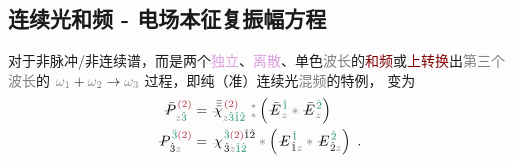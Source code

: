 \subsection{连续光和频 - 电场本征复振幅方程}\label{ssec:SFG_discrete}

对于\textcolor{NavyBlue}{非脉冲}/\textcolor{NavyBlue}{非连续谱}，而是两个\textcolor{Plum}{独立}、\textcolor{Plum}{离散}、\textcolor{NavyBlue}{单色}\textcolor{gray}{波长}的\textcolor{Maroon}{和频}或\textcolor{Maroon}{上转换}出\textcolor{gray}{第三个波长}的 $\mathcolor{gray}{\omega}_{\textcolor{gray}{1}} + \mathcolor{gray}{\omega}_{\textcolor{gray}{2}} \to \mathcolor{gray}{\omega}_{\textcolor{gray}{3}}$ 过程，即纯\textcolor{NavyBlue}{（准）连续光}\textcolor{gray}{混频}的特例， 变为
\begin{subequations} \label{eq:DP^(2)-3_12-discrete}
	\begin{align}
		\Xint{\mathcolor{gray}{-}}{30}{\bar{P}}^{\;\! \textcolor{Maroon}{(2)} }_{\;\! \mathcolor{gray}{z} \textcolor{PineGreen}{\hat{3}}} &= \Xint{{}^{}_{\mathcolor{gray}{-}}}{23}{\bar{\bar{\bar{\chi}}}}^{\;\!  \textcolor{Maroon}{(2)}}_{\mathcolor{gray}{z} \textcolor{PineGreen}{\hat{3} \hat{1} \hat{2}} } ~{}^{\mathcolor{gray}{*}}_{\mathcolor{gray}{*}} \left( \Xint{\mathcolor{gray}{-}}{295}{\bar{E}}^{\;\! \textcolor{PineGreen}{\hat{1}} }_{\;\! \mathcolor{gray}{z} } \mathcolor{gray}{*} \Xint{\mathcolor{gray}{-}}{295}{\bar{E}}^{\;\! \textcolor{PineGreen}{\hat{2}} }_{\;\! \mathcolor{gray}{z} } \right) \label{eq:vec-DP^(2)-3_12-discrete} \\
		\Xint{\mathcolor{gray}{-}}{30}{P}^{\;\! \textcolor{PineGreen}{\hat{3}} \textcolor{Maroon}{(2)} }_{\;\! \hat{3}\mathcolor{gray}{z}} &= \Xint{{}^{}_{\mathcolor{gray}{-}}}{23}{\chi}^{\;\! \textcolor{PineGreen}{\hat{3}} \textcolor{Maroon}{(2)} \hat{1} \hat{2} }_{\;\! \hat{3} \mathcolor{gray}{z} \textcolor{PineGreen}{\hat{1} \hat{2}}} \mathcolor{gray}{*} \left( \Xint{\mathcolor{gray}{-}}{295}{E}^{\;\!\textcolor{PineGreen}{\hat{1}}}_{\;\! \hat{1} \mathcolor{gray}{z}} \mathcolor{gray}{*} \Xint{\mathcolor{gray}{-}}{295}{E}^{\;\!\textcolor{PineGreen}{\hat{2}}}_{\;\! \hat{2} \mathcolor{gray}{z}} \right) ~. \label{eq:components-DP^(2)-3_12-discrete}
	\end{align}
\end{subequations}
